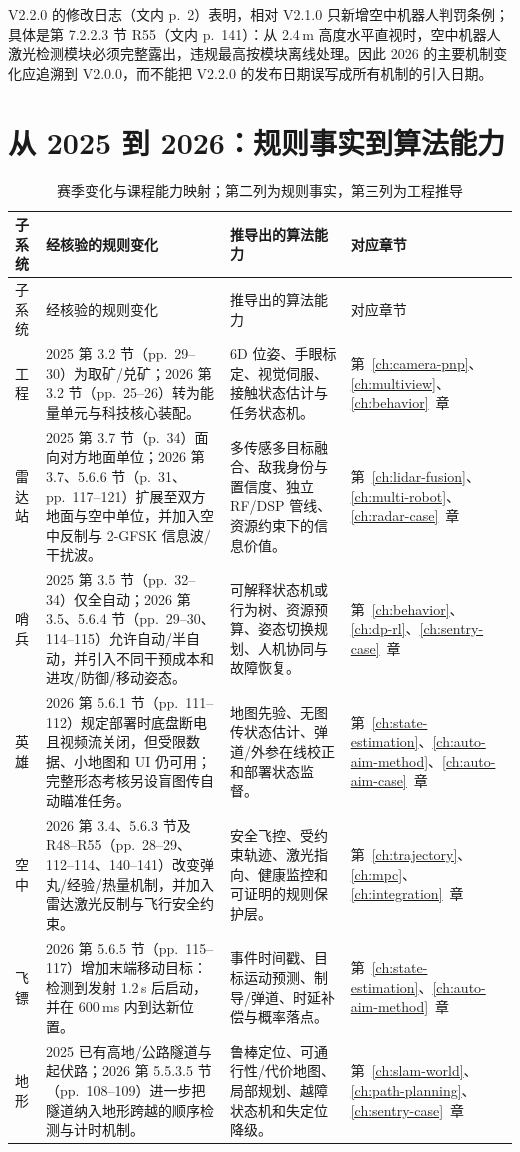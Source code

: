 V2.2.0 的修改日志（文内 p.~2）表明，相对 V2.1.0 只新增空中机器人判罚条例；具体是第 7.2.2.3 节 R55（文内 p.~141）：从 2.4\,m 高度水平直视时，空中机器人激光检测模块必须完整露出，违规最高按模块离线处理。因此 2026 的主要机制变化应追溯到 V2.0.0，而不能把 V2.2.0 的发布日期误写成所有机制的引入日期。

\section{从 2025 到 2026：规则事实到算法能力}

\begin{longtable}{p{}p{}p{}p{}}
\caption{赛季变化与课程能力映射；第二列为规则事实，第三列为工程推导}\label{tab:season-capability}\\
\toprule
子系统 & 经核验的规则变化 & 推导出的算法能力 & 对应章节 \\
\midrule
\endfirsthead
\toprule
子系统 & 经核验的规则变化 & 推导出的算法能力 & 对应章节 \\
\midrule
\endhead
工程 & 2025 第 3.2 节（pp.~29--30）为取矿/兑矿；2026 第 3.2 节（pp.~25--26）转为能量单元与科技核心装配。 & 6D 位姿、手眼标定、视觉伺服、接触状态估计与任务状态机。 & 第~\ref{ch:camera-pnp}、\ref{ch:multiview}、\ref{ch:behavior}~章 \\
雷达站 & 2025 第 3.7 节（p.~34）面向对方地面单位；2026 第 3.7、5.6.6 节（p.~31、pp.~117--121）扩展至双方地面与空中单位，并加入空中反制与 2-GFSK 信息波/干扰波。 & 多传感多目标融合、敌我身份与置信度、独立 RF/DSP 管线、资源约束下的信息价值。 & 第~\ref{ch:lidar-fusion}、\ref{ch:multi-robot}、\ref{ch:radar-case}~章 \\
哨兵 & 2025 第 3.5 节（pp.~32--34）仅全自动；2026 第 3.5、5.6.4 节（pp.~29--30、114--115）允许自动/半自动，并引入不同干预成本和进攻/防御/移动姿态。 & 可解释状态机或行为树、资源预算、姿态切换规划、人机协同与故障恢复。 & 第~\ref{ch:behavior}、\ref{ch:dp-rl}、\ref{ch:sentry-case}~章 \\
英雄 & 2026 第 5.6.1 节（pp.~111--112）规定部署时底盘断电且视频流关闭，但受限数据、小地图和 UI 仍可用；完整形态考核另设盲图传自动瞄准任务。 & 地图先验、无图传状态估计、弹道/外参在线校正和部署状态监督。 & 第~\ref{ch:state-estimation}、\ref{ch:auto-aim-method}、\ref{ch:auto-aim-case}~章 \\
空中 & 2026 第 3.4、5.6.3 节及 R48--R55（pp.~28--29、112--114、140--141）改变弹丸/经验/热量机制，并加入雷达激光反制与飞行安全约束。 & 安全飞控、受约束轨迹、激光指向、健康监控和可证明的规则保护层。 & 第~\ref{ch:trajectory}、\ref{ch:mpc}、\ref{ch:integration}~章 \\
飞镖 & 2026 第 5.6.5 节（pp.~115--117）增加末端移动目标：检测到发射 1.2\,s 后启动，并在 600\,ms 内到达新位置。 & 事件时间戳、目标运动预测、制导/弹道、时延补偿与概率落点。 & 第~\ref{ch:state-estimation}、\ref{ch:auto-aim-method}~章 \\
地形 & 2025 已有高地/公路隧道与起伏路；2026 第 5.5.3.5 节（pp.~108--109）进一步把隧道纳入地形跨越的顺序检测与计时机制。 & 鲁棒定位、可通行性/代价地图、局部规划、越障状态机和失定位降级。 & 第~\ref{ch:slam-world}、\ref{ch:path-planning}、\ref{ch:sentry-case}~章 \\
\bottomrule
\end{longtable}

